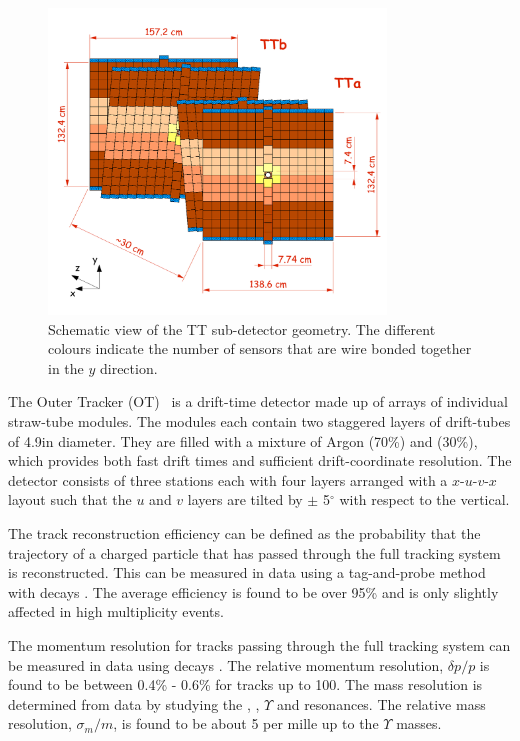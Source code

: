 \begin{figure}[!tb]
\centering
\includegraphics[width=0.8\textwidth]{figs/detector/tt.pdf}
\caption{Schematic view of the TT sub-detector geometry. The different colours indicate the number of sensors that are wire bonded together in the $y$ direction.}
\label{fig:tt}
\end{figure}

The Outer Tracker (OT)~\cite{ot-tdr,ot-perf} is a drift-time detector made up of arrays of individual straw-tube modules. The modules each contain two staggered layers of drift-tubes of 4.9\mm in diameter. They are filled with a mixture of Argon (70\%) and \cotwo (30\%), which provides both fast drift times and sufficient drift-coordinate resolution. The detector consists of three stations each with four layers arranged with a \mbox{$x$-$u$-$v$-$x$} layout such that the $u$ and $v$ layers are tilted by $\pm$ 5$^{\circ}$ with respect to the vertical.

The track reconstruction efficiency can be defined as the probability that the trajectory of a charged particle that has passed through the full tracking system is reconstructed. This can be measured in data using a tag-and-probe method with \decay{\jpsi}{\mumu} decays \cite{tracking-perf}. The average efficiency is found to be over 95\% and is only slightly affected in high multiplicity events.

The momentum resolution for tracks passing through the full tracking system can be measured in data using \decay{\jpsi}{\mumu} decays \cite{lhcb-perf}. The relative momentum resolution, $\delta p/p$ is found to be between 0.4\% - 0.6\% for tracks up to 100\gevc. The mass resolution is determined from data by studying the \jpsi, \psitwos, $\Upsilon$ and \Z resonances. The relative mass resolution, $\sigma_{m}/m$, is found to be about 5 per mille up to the $\Upsilon$ masses.


